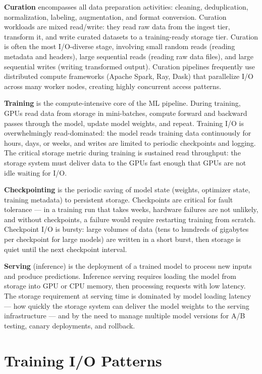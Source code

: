 \textbf{Curation} encompasses all data preparation activities: cleaning,
deduplication, normalization, labeling, augmentation, and format conversion.
Curation workloads are mixed read/write: they read raw data from the ingest
tier, transform it, and write curated datasets to a training-ready storage
tier. Curation is often the most I/O-diverse stage, involving small random
reads (reading metadata and headers), large sequential reads (reading raw data
files), and large sequential writes (writing transformed output). Curation
pipelines frequently use distributed compute frameworks (Apache Spark, Ray,
Dask) that parallelize I/O across many worker nodes, creating highly
concurrent access patterns.

\textbf{Training} is the compute-intensive core of the ML pipeline. During
training, GPUs read data from storage in mini-batches, compute forward and
backward passes through the model, update model weights, and repeat. Training
I/O is overwhelmingly read-dominated: the model reads training data
continuously for hours, days, or weeks, and writes are limited to periodic
checkpoints and logging. The critical storage metric during training is
sustained read throughput: the storage system must deliver data to the GPUs
fast enough that GPUs are not idle waiting for I/O.

\textbf{Checkpointing} is the periodic saving of model state (weights,
optimizer state, training metadata) to persistent storage. Checkpoints are
critical for fault tolerance --- in a training run that takes weeks, hardware
failures are not unlikely, and without checkpoints, a failure would require
restarting training from scratch. Checkpoint I/O is bursty: large volumes of
data (tens to hundreds of gigabytes per checkpoint for large models) are
written in a short burst, then storage is quiet until the next checkpoint
interval.

\textbf{Serving} (inference) is the deployment of a trained model to process
new inputs and produce predictions. Inference serving requires loading the
model from storage into GPU or CPU memory, then processing requests with low
latency. The storage requirement at serving time is dominated by model loading
latency --- how quickly the storage system can deliver the model weights to
the serving infrastructure --- and by the need to manage multiple model
versions for A/B testing, canary deployments, and rollback.

\section{Training I/O Patterns}

